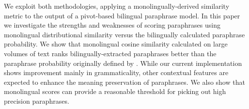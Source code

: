 \documentclass[11pt]{article}
\begin{document}


We exploit both methodologies, applying a monolingually-derived similarity metric to the output of a pivot-based bilingual paraphrase model.  
In this paper we investigate the strengths and weaknesses of scoring paraphrases using monolingual distributional similarity versus the bilingually calculated paraphrase probability.  We show that monolingual cosine similarity calculated on large volumes of text ranks bilingually-extracted paraphrases better than the paraphrase probability originally defined by . While our current implementation shows improvement mainly in grammaticality, other contextual features are expected to enhance the meaning preservation of paraphrases. We also show that monolingual scores can provide a reasonable threshold for picking out high precision paraphrases. 

\end{document}
